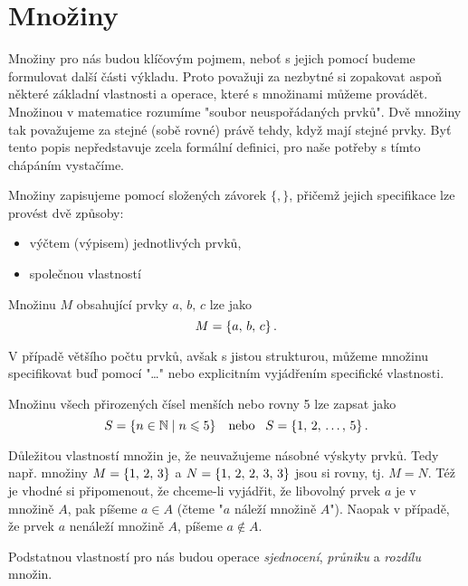 \section{Množiny}

Množiny pro nás budou klíčovým pojmem, neboť s jejich pomocí budeme formulovat další části výkladu. Proto považuji za nezbytné si zopakovat aspoň některé základní vlastnosti a operace, které s množinami můžeme provádět. Množinou v matematice rozumíme "soubor neuspořádaných prvků". Dvě množiny tak považujeme za stejné (sobě rovné) právě tehdy, když mají stejné prvky. Byť tento popis nepředstavuje zcela formální definici, pro naše potřeby s tímto chápáním vystačíme.\par
Množiny zapisujeme pomocí složených závorek $\{,\}$, přičemž jejich specifikace lze provést dvě způsoby:
\begin{itemize}
    \item výčtem (výpisem) jednotlivých prvků,
    \item společnou vlastností
\end{itemize}

\begin{example}
    Množinu $M$ obsahující prvky $a,\,b,\,c$ lze jako
    \begin{equation*}
        M=\left\{a,\,b,\,c\right\}.
    \end{equation*}
\end{example}
V případě většího počtu prvků, avšak s jistou strukturou, můžeme množinu specifikovat buď pomocí "\dots" nebo explicitním vyjádřením specifické vlastnosti.

\begin{example}
    Množinu všech přirozených čísel menších nebo rovny 5 lze zapsat jako
    \begin{equation*}
        S=\left\{n\in\mathbb{N} \;\middle\vert\; n \leqslant 5\right\}\;\;\;\text{nebo}\;\;\;S=\left\{1,\,2,\,\dots,\,5\right\}.
    \end{equation*}
\end{example}

Důležitou vlastností množin je, že neuvažujeme násobné výskyty prvků. Tedy např. množiny $M=\left\{1,\,2,\,3\right\}$ a $N=\left\{1,\,2,\,2,\,3,\,3\right\}$ jsou si rovny, tj. $M=N$. Též je vhodné si připomenout, že chceme-li vyjádřit, že libovolný prvek $a$ je v množině $A$, pak píšeme $a \in A$ (čteme "$a$ náleží množině $A$"). Naopak v případě, že prvek $a$ nenáleží množině $A$, píšeme $a \notin A$.\par
Podstatnou vlastností pro nás budou operace \emph{sjednocení}, \emph{průniku} a \emph{rozdílu} množin.

